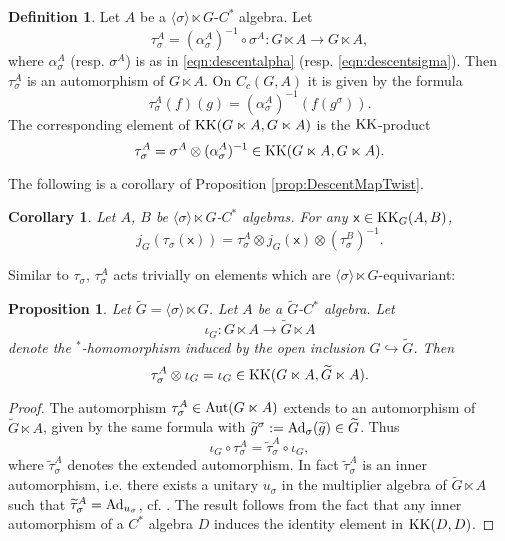 \documentclass[11pt,reqno]{amsart}
\newtheorem{corollary}[theorem]{Corollary}
\newtheorem{proposition}[theorem]{Proposition}
\theoremstyle{definition}
\newtheorem{definition}[theorem]{Definition}
\theoremstyle{remark}
\newcommand{\ti}[1]{\widetilde{#1}}
\newcommand{\st}[1]{\mathsf{#1}}
\def\Ad{\ensuremath{\textnormal{Ad}}}
\def\Aut{\ensuremath{\textnormal{Aut}}}
\def\KK{\ensuremath{\textnormal{KK}}}
\begin{document}
\begin{definition}
Let $A$ be a $\langle \sigma \rangle \ltimes G$-$C^\ast$ algebra.  Let
\[ \tau^A_\sigma=(\alpha^A_\sigma)^{-1} \circ \sigma^A \colon G\ltimes A \rightarrow G\ltimes A,\]
where $\alpha^A_\sigma$ (resp. $\sigma^A$) is as in \eqref{eqn:descentalpha} (resp. \eqref{eqn:descentsigma}).  Then $\tau^A_\sigma$ is an automorphism of $G\ltimes A$.  On $C_c(G,A)$ it is given by the formula
\[ \tau^A_\sigma(f)(g)=(\alpha^A_\sigma)^{-1}(f(g^\sigma)).\]
The corresponding element of $\KK(G\ltimes A,G\ltimes A)$ is the $\KK$-product
\[ \tau^A_\sigma=\sigma^A \otimes (\alpha^A_\sigma)^{-1} \in \KK(G\ltimes A,G\ltimes A).\]
\end{definition}
The following is a corollary of Proposition \ref{prop:DescentMapTwist}.
\begin{corollary}
\label{prop:DescentMapTwist2}
Let $A$, $B$ be $\langle \sigma \rangle \ltimes G$-$C^\ast$ algebras.  For any $\st{x} \in \KK_G(A,B)$,
\[ j_G(\tau_\sigma(\st{x}))=\tau^A_\sigma \otimes j_G(\st{x}) \otimes (\tau^B_\sigma)^{-1}.\]
\end{corollary}
Similar to $\tau_\sigma$, $\tau^A_\sigma$ acts trivially on elements which are $\langle \sigma \rangle \ltimes G$-equivariant:
\begin{proposition}
\label{prop:DescentMapTwist3}
Let $\ti{G}=\langle \sigma \rangle \ltimes G$.  Let $A$ be a $\ti{G}$-$C^\ast$ algebra.  Let 
\[\iota_G \colon G\ltimes A \rightarrow \ti{G} \ltimes A\] 
denote the $^\ast$-homomorphism induced by the open inclusion $G \hookrightarrow \ti{G}$.  Then
\[ \tau^A_\sigma \otimes \iota_G = \iota_G \in \KK(G\ltimes A,\ti{G} \ltimes A).\]
\end{proposition}
\begin{proof}
The automorphism $\tau^A_\sigma \in \Aut(G\ltimes A)$ extends to an automorphism of $\ti{G} \ltimes A$, given by the same formula with $\ti{g}^\sigma:=\Ad_\sigma(\ti{g}) \in \ti{G}$.  Thus
\[ \iota_G \circ \tau^A_\sigma=\ti{\tau}^A_\sigma \circ \iota_G,\]
where $\ti{\tau}^A_\sigma$ denotes the extended automorphism.  In fact $\ti{\tau}^A_\sigma$ is an inner automorphism, i.e. there exists a unitary $u_\sigma$ in the multiplier algebra of $\ti{G} \ltimes A$ such that $\ti{\tau}^A_\sigma=\Ad_{u_\sigma}$, cf. \cite[II.10.3.10]{BlackadarCAlgebras}.  The result follows from the fact that any inner automorphism of a $C^\ast$ algebra $D$ induces the identity element in $\KK(D,D)$.
\end{proof}
\end{document}
